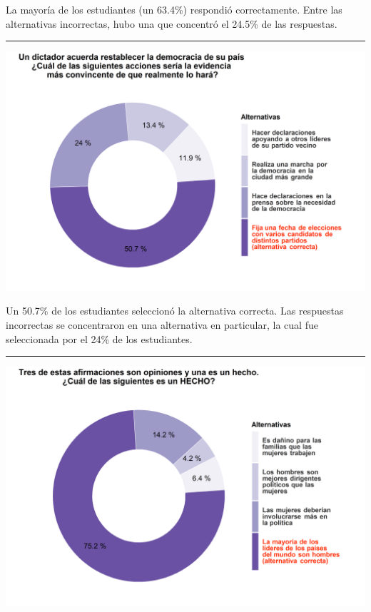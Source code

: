 \documentclass[
  14pt,
]{book}
\let\origfigure\figure
\let\endorigfigure\endfigure
\renewenvironment{figure}[1][2] {
  \expandafter\origfigure\expandafter[H]
} {
  \endorigfigure
}
\begin{document}
La mayoría de los estudiantes (un 63.4\%) respondió correctamente. Entre las alternativas incorrectas, hubo una que concentró el 24.5\% de las respuestas.

\begin{center}\rule{0.5\linewidth}{0.5pt}\end{center}

\begin{figure}[!ht]

{\centering \includegraphics[width=0.8\linewidth,]{images/ccivico_5} 

}

\caption{Acción que demuestra que un dictador restablecerá la democracia}\label{fig:unnamed-chunk-9}
\end{figure}

Un 50.7\% de los estudiantes seleccionó la alternativa correcta. Las respuestas incorrectas se concentraron en una alternativa en particular, la cual fue seleccionada por el 24\% de los estudiantes.

\begin{center}\rule{0.5\linewidth}{0.5pt}\end{center}

\begin{figure}[!ht]

{\centering \includegraphics[width=0.8\linewidth,]{images/ccivico_6} 

}

\caption{Afirmación que corresponde a un hecho}\label{fig:unnamed-chunk-10}
\end{figure}
\end{document}

